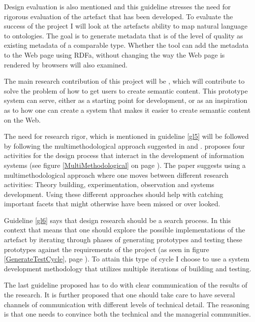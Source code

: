 Design evaluation is also mentioned and this guideline stresses the need for rigorous evaluation of the artefact that has been developed.
To evaluate the success of the project I will look at the artefacts ability to map natural language to ontologies.
The goal is to generate metadata that is of the level of quality as existing metadata of a comparable type.
Whether the tool can add the metadata to the Web page using RDFa, without changing the way the Web page is rendered by browsers will also examined.

The main research contribution of this project will be \theartefact,
which will contribute to solve the problem of how to get users to create semantic content.
This prototype system can serve, either as a starting point for development,
or as an inspiration as to how one can create a system that makes it easier to create semantic content on the Web.

The need for research rigor, which is mentioned in guideline \ref{gl5} will be followed by following the multimethodological approach suggested in \citet{Chen1990} and \citet{NunamakerJr1990}.
\citet{Chen1990} proposes four activities for the design process that interact in the development of information systems
(see figure \ref{MultiMethodological} on page \pageref{MultiMethodological}).
The paper suggests using a multimethodological approach where one moves between different research activities:
Theory building, experimentation, observation and systems development.
Using these different approaches should help with catching important facets that might otherwise have been missed or over looked.

Guideline \ref{gl6} says that design research should be a search process.
In this context that means that one should explore the possible implementations of the artefact by iterating through phases of
generating prototypes and testing these prototypes against the requirements of the project (as seen in figure \ref{GenerateTestCycle},
page \pageref{GenerateTestCycle}).
To attain this type of cycle I choose to use a system development methodology that utilizes multiple iterations of building and testing.

The last guideline proposed has to do with clear communication of the results of the research.
It is further proposed that one should take care to have several channels of communication with different levels of technical detail.
The reasoning is that one needs to convince both the technical and the managerial communities.

